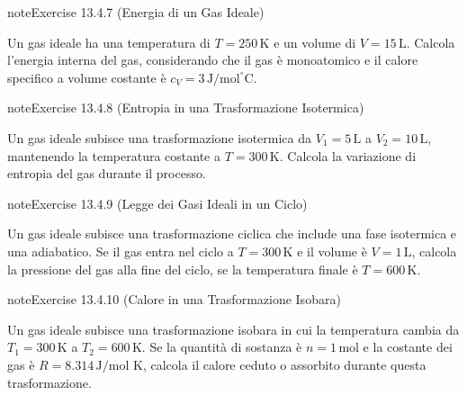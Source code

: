 \documentclass[letterpaper,10pt,italian]{jupyterBook}
\begin{document}
\begin{sphinxadmonition}{note}{Exercise 13.4.7 (Energia di un Gas Ideale)}



\sphinxAtStartPar
Un gas ideale ha una temperatura di \(T = 250 \, \text{K}\) e un volume di \(V = 15 \, \text{L}\). Calcola l’energia interna del gas, considerando che il gas è monoatomico e il calore specifico a volume costante è \(c_V = 3 \, \text{J/mol}^\circ \text{C}\).
\end{sphinxadmonition}
 \label{exercise:ch/thermodynamics/matter-problems-exercise-7}

\begin{sphinxadmonition}{note}{Exercise 13.4.8 (Entropia in una Trasformazione Isotermica)}



\sphinxAtStartPar
Un gas ideale subisce una trasformazione isotermica da \(V_1 = 5 \, \text{L}\) a \(V_2 = 10 \, \text{L}\), mantenendo la temperatura costante a \(T = 300 \, \text{K}\). Calcola la variazione di entropia del gas durante il processo.
\end{sphinxadmonition}
 \label{exercise:ch/thermodynamics/matter-problems-exercise-8}

\begin{sphinxadmonition}{note}{Exercise 13.4.9 (Legge dei Gasi Ideali in un Ciclo)}



\sphinxAtStartPar
Un gas ideale subisce una trasformazione ciclica che include una fase isotermica e una adiabatico. Se il gas entra nel ciclo a \(T = 300 \, \text{K}\) e il volume è \(V = 1 \, \text{L}\), calcola la pressione del gas alla fine del ciclo, se la temperatura finale è \(T = 600 \, \text{K}\).
\end{sphinxadmonition}
 \label{exercise:ch/thermodynamics/matter-problems-exercise-9}

\begin{sphinxadmonition}{note}{Exercise 13.4.10 (Calore in una Trasformazione Isobara)}



\sphinxAtStartPar
Un gas ideale subisce una trasformazione isobara in cui la temperatura cambia da \(T_1 = 300 \, \text{K}\) a \(T_2 = 600 \, \text{K}\). Se la quantità di sostanza è \(n = 1 \, \text{mol}\) e la costante dei gas è \(R = 8.314 \, \text{J/mol K}\), calcola il calore ceduto o assorbito durante questa trasformazione.
\end{sphinxadmonition}
 \label{exercise:ch/thermodynamics/matter-problems-exercise-10}
\end{document}
